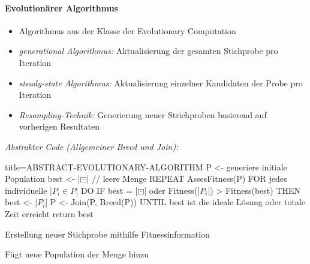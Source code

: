 \documentclass[
    ngerman,
    color=3b,
    dark_mode,
    load_common, %
    summary,
    boxarc,
]{tuda_summary}
\begin{document}
\paragraph{Evolutionärer Algorithmus}\mbox{}
\begin{idea}\mbox{}
    \begin{itemize}
        \item Algorithmus aus der Klasse der Evolutionary Computation
        \item \textit{generational Algorithmus:} Aktualisierung der gesamten Stichprobe pro Iteration
        \item \textit{steady-state Algorithmus:} Aktualisierung einzelner Kandidaten der Probe pro Iteration
        \item \textit{Resampling-Technik:} Generierung neuer Strichproben basierend auf vorherigen Resultaten
    \end{itemize}
\end{idea}
\textit{Abstrakter Code (Allgemeiner Breed und Join):}
\begin{codeBlock}[autogobble,escapeinside=||]{title={ABSTRACT-EVOLUTIONARY-ALGORITHM}}
    P <- generiere initiale Population
    best <- |$\boxdot$| // leere Menge
    REPEAT
        AssesFitness(P)
        FOR jedes individuelle |$P_i \in P$| DO
            IF best = |$\boxdot$| oder Fitness(|$P_i$|) > Fitness(best) THEN
                best <- |$P_i$|
        P <- Join(P, Breed(P))
    UNTIL best ist die ideale Lösung oder totale Zeit erreicht
    return best
\end{codeBlock}
\begin{description}[leftmargin=2cm]
    \item [Breed] Erstellung neuer Stichprobe mithilfe Fitnessinformation
    \item [Join] Fügt neue Population der Menge hinzu
\end{description}
\end{document}
